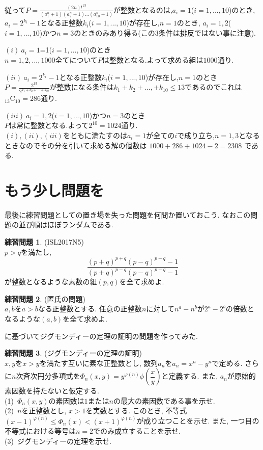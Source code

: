 \documentclass{ltjsarticle}
\theoremstyle{definition}
\newtheorem{prob}{練習問題}
\begin{document}
従って$P=\displaystyle\frac{(2n)!^{13}}{(a_1^n+1)(a_2^n+1)...(a_{10}^n+1)}$が整数となるのは,$a_i=1$($i=1,...,10$)のとき, $a_i=2^{k_i}-1$となる正整数$k_i$($i=1,...,10$)が存在し,$n=1$のとき, $a_i=1,2$($i=1,...,10$)かつ$n=3$のときのみあり得る(この$3$条件は排反ではない事に注意).

$(i)\ a_i=1$=1($i=1,...,10$)のとき\\
$n=1,2,...,1000$全てについて$P$は整数となる.よって求める組は$1000$通り.

$(ii)\ a_i=2^{k_i}-1$となる正整数$k_i$($i=1,...,10$)が存在し,$n=1$のとき\\
$P=\displaystyle\frac{2^{13}}{2^{k_1+k_2+...+k_{10}}}$が整数になる条件は$k_1+k_2+...,+k_{10}\leq 13$であるのでこれは${}_{13}\mathrm{C}_{10}=286$通り.

$(iii)\ a_i=1,2$($i=1,...,10$)かつ$n=3$のとき\\
$P$は常に整数となる.よって$2^{10}=1024$通り.\\
$(i),(ii),(iii)$をともに満たすのは$a_i=1$が全ての$i$で成り立ち,$n=1,3$となるときなのでその分を引いて求める解の個数は
$1000+286+1024-2=2308$
である.

\section{もう少し問題を}
最後に練習問題としての置き場を失った問題を何問か置いておこう. なおこの問題の並び順はほぼランダムである.

\begin{prob}(ISL2017N5)\\
$p>q$を満たし,$$\frac{(p+q)^{p+q}(p-q)^{p-q}-1}{(p+q)^{p-q}(p-q)^{p+q}-1}$$が整数となるような素数の組$(p,q)$を全て求めよ.
\end{prob}

\begin{prob}(匿氏の問題)\\
$a,b$を$a>b$なる正整数とする. 任意の正整数$n$に対して$n^a−n^b$が$2^a−2^b$の倍数となるような$(a,b)$を全て求めよ.
\end{prob}

\cite{ジグモンディー}に基づいてジグモンディーの定理の証明の問題を作ってみた.
\begin{prob}(ジグモンディーの定理の証明)\\
$x,y$を$x>y$を満たす互いに素な正整数とし, 数列$a_n$を$a_n=x^n-y^n$で定める. さらに$n$次斉次円分多項式を$\Phi_n(x,y)=y^{\varphi(n)}\phi\left(\dfrac{x}{y}\right)$と定義する. また, $a_n$が原始的素因数を持たないと仮定する.\\
(1)\ $\Phi_n(x,y)$の素因数は$1$または$n$の最大の素因数である事を示せ. \\
(2)\ $n$を正整数とし, $x>1$を実数とする. このとき, 不等式
$(x−1)^{\varphi(n)}\leq\Phi_n(x)<(x+1)^{\varphi(n)}$が成り立つことを示せ. また, 一つ目の不等式における等号は$n=2$でのみ成立することを示せ.\\
(3)\ ジグモンディーの定理を示せ.
\end{prob}
\end{document}
